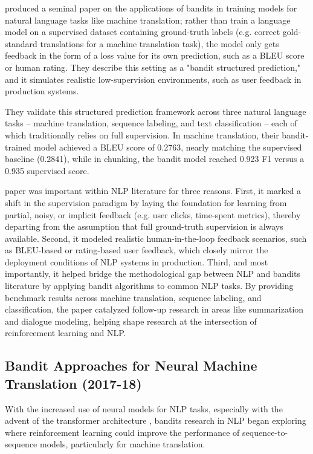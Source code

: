 \documentclass[11pt]{article}
\begin{document}
\citet{sokolov-etal-2016-learning} produced a seminal paper on the applications of bandits in training models for natural language tasks like machine translation; rather than train a language model on a supervised dataset containing ground-truth labels (e.g. correct gold-standard translations for a machine translation task), the model only gets feedback in the form of a loss value for its own prediction, such as a BLEU score or human rating. They describe this setting as a "bandit structured prediction," and it simulates realistic low-supervision environments, such as user feedback in production systems.

They validate this structured prediction framework across three natural language tasks – machine translation, sequence labeling, and text classification – each of which traditionally relies on full supervision. In machine translation, their bandit-trained model achieved a BLEU score of 0.2763, nearly matching the supervised baseline (0.2841), while in chunking, the bandit model reached 0.923 F1 versus a 0.935 supervised score.

 paper was important within NLP literature for three reasons. First, it marked a shift in the supervision paradigm by laying the foundation for learning from partial, noisy, or implicit feedback (e.g. user clicks, time-spent metrics), thereby departing from the assumption that full ground-truth supervision is always available. Second, it modeled realistic human-in-the-loop feedback scenarios, such as BLEU-based or rating-based user feedback, which closely mirror the deployment conditions of NLP systems in production. Third, and most importantly, it helped bridge the methodological gap between NLP and bandits literature by applying bandit algorithms to common NLP tasks. By providing benchmark results across machine translation, sequence labeling, and classification, the paper catalyzed follow-up research in areas like summarization and dialogue modeling, helping shape research at the intersection of reinforcement learning and NLP.

\subsection{Bandit Approaches for Neural Machine Translation (2017-18)}

With the increased use of neural models for NLP tasks, especially with the advent of the transformer architecture \cite{vaswani2017}, bandits research in NLP began exploring where reinforcement learning could improve the performance of sequence-to-sequence models, particularly for machine translation. 
\end{document}
